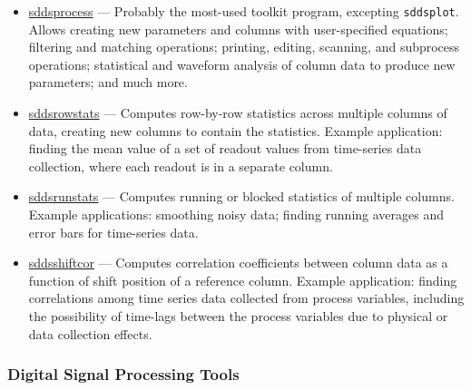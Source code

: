 \documentclass[11pt]{article}
\newcommand{\progref}[1]{\hyperref[#1]{#1}}
\begin{document}
\begin{itemize}
\item \progref{sddsprocess} --- Probably the most-used toolkit program, excepting \verb|sddsplot|.  Allows
creating new parameters and columns with user-specified equations; filtering and matching operations; printing,
editing, scanning, and subprocess operations; statistical and waveform analysis of column data to produce new
parameters; and much more.

\item \progref{sddsrowstats} --- Computes row-by-row statistics across multiple columns of data, creating
new columns to contain the statistics.  Example application: finding the mean value of a set of readout
values from time-series data collection, where each readout is in a separate column.

\item \progref{sddsrunstats} --- Computes running or blocked statistics of multiple columns.  Example
applications: smoothing noisy data; finding running averages and error bars for time-series data.

\item \progref{sddsshiftcor} --- Computes correlation coefficients
between column data as a function of shift position of a reference
column.  Example application: finding correlations among time series
data collected from process variables, including the possibility of
time-lags between the process variables due to physical or data
collection effects.

\end{itemize}

\subsubsection{Digital Signal Processing Tools}
\end{document}
